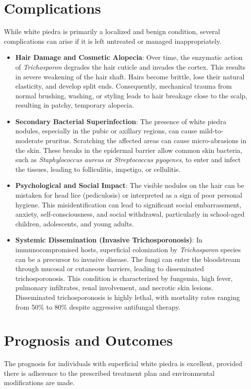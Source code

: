 \section*{Complications}
While white piedra is primarily a localized and benign condition, several complications can arise if it is left untreated or managed inappropriately.

\begin{itemize}
    \item \textbf{Hair Damage and Cosmetic Alopecia}: Over time, the enzymatic action of \textit{Trichosporon} degrades the hair cuticle and invades the cortex. This results in severe weakening of the hair shaft. Hairs become brittle, lose their natural elasticity, and develop split ends. Consequently, mechanical trauma from normal brushing, washing, or styling leads to hair breakage close to the scalp, resulting in patchy, temporary alopecia.
    \item \textbf{Secondary Bacterial Superinfection}: The presence of white piedra nodules, especially in the pubic or axillary regions, can cause mild-to-moderate pruritus. Scratching the affected areas can cause micro-abrasions in the skin. These breaks in the epidermal barrier allow common skin bacteria, such as \textit{Staphylococcus aureus} or \textit{Streptococcus pyogenes}, to enter and infect the tissues, leading to folliculitis, impetigo, or cellulitis.
    \item \textbf{Psychological and Social Impact}: The visible nodules on the hair can be mistaken for head lice (pediculosis) or interpreted as a sign of poor personal hygiene. This misidentification can lead to significant social embarrassment, anxiety, self-consciousness, and social withdrawal, particularly in school-aged children, adolescents, and young adults.
    \item \textbf{Systemic Dissemination (Invasive Trichosporonosis)}: In immunocompromised hosts, superficial colonization by \textit{Trichosporon} species can be a precursor to invasive disease. The fungi can enter the bloodstream through mucosal or cutaneous barriers, leading to disseminated trichosporonosis. This condition is characterized by fungemia, high fever, pulmonary infiltrates, renal involvement, and necrotic skin lesions. Disseminated trichosporonosis is highly lethal, with mortality rates ranging from 50\% to 80\% despite aggressive antifungal therapy.
\end{itemize}

\section*{Prognosis and Outcomes}
The prognosis for individuals with superficial white piedra is excellent, provided there is adherence to the prescribed treatment plan and environmental modifications are made.

